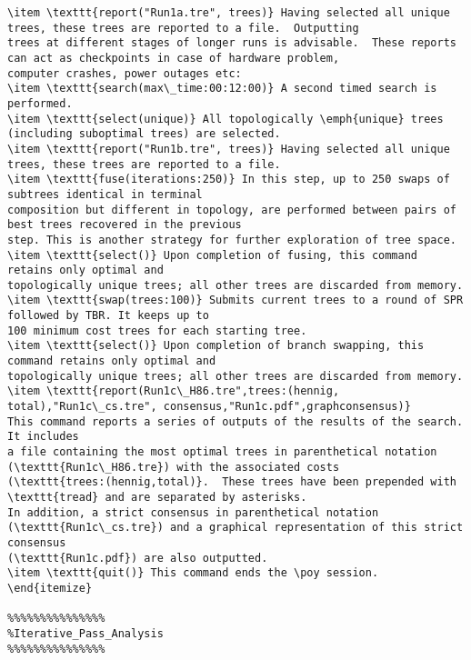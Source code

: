 \begin{verbatim}
\item \texttt{report("Run1a.tre", trees)} Having selected all unique trees, these trees are reported to a file.  Outputting
trees at different stages of longer runs is advisable.  These reports can act as checkpoints in case of hardware problem, 
computer crashes, power outages etc: 
\item \texttt{search(max\_time:00:12:00)} A second timed search is performed.  
\item \texttt{select(unique)} All topologically \emph{unique} trees (including suboptimal trees) are selected.
\item \texttt{report("Run1b.tre", trees)} Having selected all unique trees, these trees are reported to a file.  
\item \texttt{fuse(iterations:250)} In this step, up to 250 swaps of subtrees identical in terminal 
composition but different in topology, are performed between pairs of best trees recovered in the previous 
step. This is another strategy for further exploration of tree space.
\item \texttt{select()} Upon completion of fusing, this command retains only optimal and 
topologically unique trees; all other trees are discarded from memory.
\item \texttt{swap(trees:100)} Submits current trees to a round of SPR followed by TBR. It keeps up to 
100 minimum cost trees for each starting tree.
\item \texttt{select()} Upon completion of branch swapping, this command retains only optimal and 
topologically unique trees; all other trees are discarded from memory.
\item \texttt{report(Run1c\_H86.tre",trees:(hennig, total),"Run1c\_cs.tre", consensus,"Run1c.pdf",graphconsensus)} 
This command reports a series of outputs of the results of the search.  It includes 
a file containing the most optimal trees in parenthetical notation (\texttt{Run1c\_H86.tre}) with the associated costs 
(\texttt{trees:(hennig,total)}.  These trees have been prepended with \texttt{tread} and are separated by asterisks. 
In addition, a strict consensus in parenthetical notation (\texttt{Run1c\_cs.tre}) and a graphical representation of this strict consensus
(\texttt{Run1c.pdf}) are also outputted.
\item \texttt{quit()} This command ends the \poy session.
\end{itemize}

%%%%%%%%%%%%%%%
%Iterative_Pass_Analysis
%%%%%%%%%%%%%%%


\end{verbatim}
